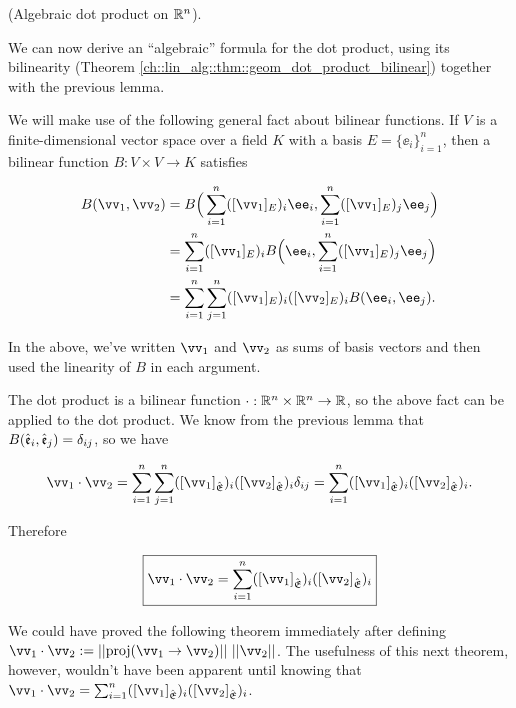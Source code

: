\begin{deriv}
    (Algebraic dot product on $\mathbb{R}^n$). 
    
    We can now derive an ``algebraic'' formula for the dot product, using its bilinearity (Theorem \ref{ch::lin_alg::thm::geom_dot_product_bilinear}) together with the previous lemma.
    
    We will make use of the following general fact about bilinear functions. If $V$ is a finite-dimensional vector space over a field $K$ with a basis $E = \{\ee_i\}_{i = 1}^n$, then a bilinear function $B:V \times V \rightarrow K$ satisfies
    
    \begin{align*}
        B(\vv_1, \vv_2) &= B\Big(\sum_{i = 1}^n ([\vv_1]_E)_i \ee_i, \sum_{i = 1}^n ([\vv_1]_E)_j \ee_j\Big) \\
        &= \sum_{i = 1}^n ([\vv_1]_E)_i B\Big(\ee_i, \sum_{i = 1}^n ([\vv_1]_E)_j \ee_j\Big) \\
        &= \sum_{i = 1}^n \sum_{j = 1}^n ([\vv_1]_E)_i ([\vv_2]_E)_i B(\ee_i, \ee_j).
    \end{align*}
    
    In the above, we've written $\vv_1$ and $\vv_2$ as sums of basis vectors and then used the linearity of $B$ in each argument.
    
   The dot product is a bilinear function $\cdot:\mathbb{R}^n \times \mathbb{R}^n \rightarrow \mathbb{R}$, so the above fact can be applied to the dot product. We know from the previous lemma that $B(\hat{\mathfrak{e}}_i, \hat{\mathfrak{e}}_j) = \delta_{ij}$, so we have
    
    \begin{align*}
        \vv_1 \cdot \vv_2 = \sum_{i = 1}^n \sum_{j = 1}^n ([\vv_1]_\sE)_i ([\vv_2]_\sE)_i \delta_{ij} = \sum_{i = 1}^n ([\vv_1]_\sE)_i ([\vv_2]_\sE)_i.
    \end{align*}
    
    Therefore
    
    \begin{align*}
        \boxed
        {
            \vv_1 \cdot \vv_2 = \sum_{i = 1}^n ([\vv_1]_\sE)_i ([\vv_2]_\sE)_i
        }
    \end{align*}
\end{deriv}

We could have proved the following theorem immediately after defining $\vv_1 \cdot \vv_2 := ||\proj(\vv_1 \rightarrow \vv_2)|| \spc ||\vv_2||$. The usefulness of this next theorem, however, wouldn't have been apparent until knowing that $\vv_1 \cdot \vv_2 = \sum_{i = 1}^n ([\vv_1]_\sE)_i ([\vv_2]_\sE)_i$.

